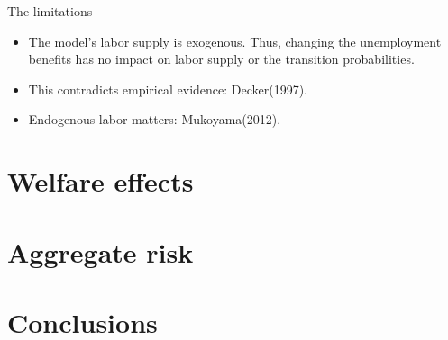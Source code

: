 \documentclass{beamer}
\begin{document}
\begin{frame}{The limitations}
	
	\begin{itemize}
	
	\item {The model's labor supply is exogenous. Thus, changing the unemployment benefits has no impact on labor supply or the transition probabilities.
}	
	\item {This contradicts empirical evidence: Decker(1997).
	}
	\item{Endogenous labor matters: Mukoyama(2012).
	}

	\end{itemize} 
\end{frame}


\section{Welfare effects}
\subsection{}


\section{Aggregate risk}
\subsection{}

\section{Conclusions}
\subsection{}
\end{document}
